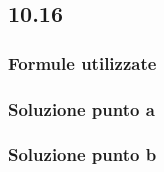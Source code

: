 \documentclass[../../main.tex]{subfiles}
\begin{document}
\subsection*{10.16}
\subsubsection*{Formule utilizzate}
\subsubsection*{Soluzione punto a}
\subsubsection*{Soluzione punto b}
\newpage
\end{document}
